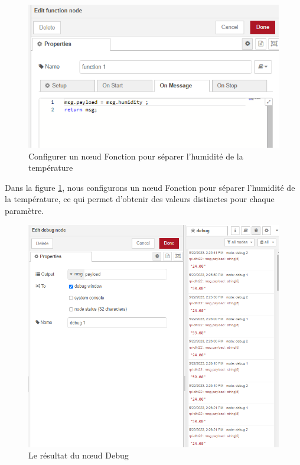 \begin{figure}[H]
\centering
\includegraphics[width=15cm]{Images/Node-9.png}
\caption{Configurer un nœud Fonction pour séparer l'humidité de la température}
\label{Chap4.3.16}
\end{figure}

Dans la figure \ref{Chap4.3.16}, nous configurons un nœud Fonction pour séparer l'humidité de la température, ce qui permet d'obtenir des valeurs distinctes pour chaque paramètre.

\begin{figure}[H]
\centering
\includegraphics[width=15cm]{Images/Node-10.png}
\caption{Le résultat du nœud Debug}
\label{Chap4.3.17}
\end{figure}

